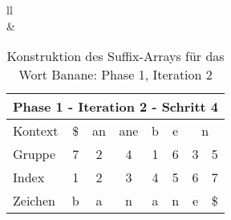 \begin{table}[H]
\begin{adjustbox}{max width=\textwidth}
\begin{tabular}{ll}
\\
&
\\

\begin{tabular}{lccccccc}
\multicolumn{8}{l}{Phase 1 - Iteration 2 - Schritt 4}                                                                                                                                                                                  \\ \hline
\multicolumn{1}{l|}{Kontext} & \multicolumn{1}{c|}{\$} & \multicolumn{1}{c|}{\cellcolor[HTML]{\yellow}an} & \multicolumn{1}{c|}{\cellcolor[HTML]{\yellow}ane} & \multicolumn{1}{c|}{b} & \multicolumn{1}{c|}{e} & \multicolumn{2}{c}{n} \\
\multicolumn{1}{l|}{Gruppe}  & \multicolumn{1}{c|}{7}  & \multicolumn{1}{c|}{\cellcolor[HTML]{\yellow}2}  & \multicolumn{1}{c|}{\cellcolor[HTML]{\yellow}4}   & \multicolumn{1}{c|}{1} & \multicolumn{1}{c|}{6} & 3         & 5          \\ \hline
\multicolumn{1}{l|}{Index}   & 1                       & 2                                               & 3                                                & 4                      & 5                      & 6         & 7          \\
\multicolumn{1}{l|}{Zeichen} & b                       & a                                               & n                                                & a                      & n                      & e         & \$        
\end{tabular}

\end{tabular}
\end{adjustbox}

\caption[Konstruktion des Suffix-Arrays für das Wort Banane: Phase 1, Iteration 2]{Konstruktion des Suffix-Arrays für das Wort Banane: Phase 1, Iteration 2}
\label{gsaca:fig_banane_1_2} 
\end{table}

